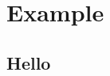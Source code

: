 \chapter{Example}
\label{ch:example}


\section{Hello}
\label{sec:hello}


\vspace{0.3cm}
\lstset{style=cpp}
\fbox{}
\vspace{0.3cm}

